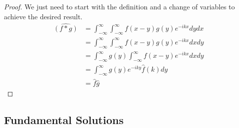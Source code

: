 \documentclass{article}
\theoremstyle{definition}
\begin{document}
\begin{proof}
    We just need to start with the definition and a change of variables to achieve the desired result.
    \begin{equation*}
        \begin{split}
            \widehat{(f*g)} &= \int^\infty_{-\infty} \int^\infty_{-\infty}f(x-y)g(y)e^{-ikx}dydx \\
            &=\int^\infty_{-\infty} \int^\infty_{-\infty}f(x-y)g(y)e^{-ikx}dxdy\\ 
            &= \int^\infty_{-\infty} g(y) \int^\infty_{-\infty} f(x-y) e^{-ikx}dxdy \\
            &= \int^\infty_{-\infty} g(y) e^{-iky} \hat f(k)dy \\
            &= \hat f \hat g
        \end{split}
    \end{equation*}
\end{proof}

\subsection{Fundamental Solutions}
\end{document}
